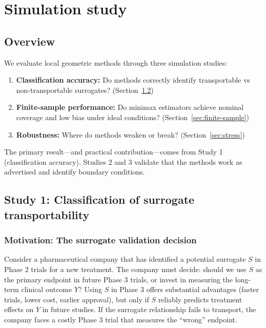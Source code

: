 \documentclass{article}
\begin{document}
\section{Simulation study}\label{sec:simulation}

\subsection{Overview}

We evaluate local geometric methods through three simulation studies:
\begin{enumerate}
    \item \textbf{Classification accuracy:} Do methods correctly identify transportable vs non-transportable surrogates? (Section~\ref{sec:classification})

    \item \textbf{Finite-sample performance:} Do minimax estimators achieve nominal coverage and low bias under ideal conditions? (Section~\ref{sec:finite-sample})

    \item \textbf{Robustness:} Where do methods weaken or break? (Section~\ref{sec:stress})
\end{enumerate}

The primary result---and practical contribution---comes from Study 1 (classification accuracy). Studies 2 and 3 validate that the methods work as advertised and identify boundary conditions.

\subsection{Study 1: Classification of surrogate transportability}\label{sec:classification}

\subsubsection{Motivation: The surrogate validation decision}

Consider a pharmaceutical company that has identified a potential surrogate $S$ in Phase 2 trials for a new treatment. The company must decide: should we use $S$ as the primary endpoint in future Phase 3 trials, or invest in measuring the long-term clinical outcome $Y$? Using $S$ in Phase 3 offers substantial advantages (faster trials, lower cost, earlier approval), but only if $S$ reliably predicts treatment effects on $Y$ in future studies. If the surrogate relationship fails to transport, the company faces a costly Phase 3 trial that measures the ``wrong'' endpoint.
\end{document}
